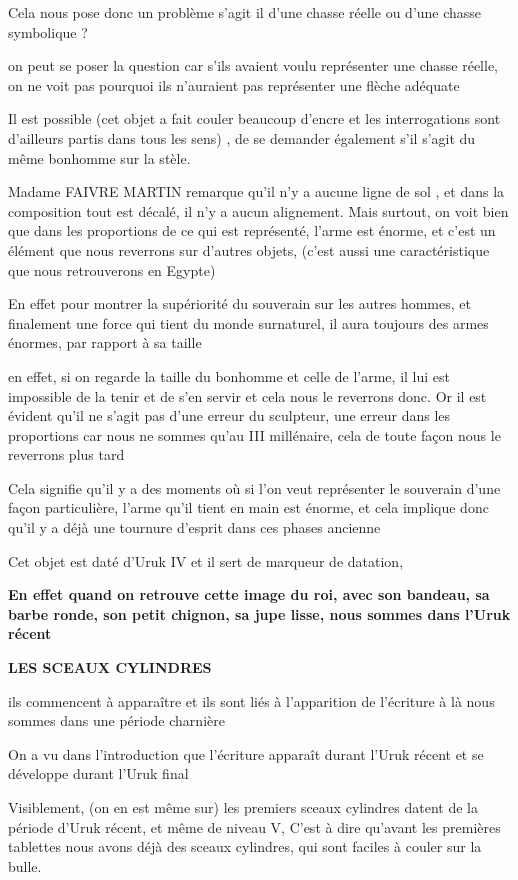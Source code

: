\documentclass[a4paper,10pt]{article}
\begin{document}
Cela nous pose donc un problème  s'agit il
d'une chasse réelle ou d'une chasse
symbolique ?

on peut se poser la question car s'ils avaient voulu
représenter une chasse réelle, on ne voit pas pourquoi ils
n'auraient pas représenter une flèche adéquate

Il est possible (cet objet a fait couler beaucoup
d'encre et les interrogations sont
d'ailleurs partis dans tous les  sens) , de se
demander également s'il s'agit du
même bonhomme sur la stèle.

Madame FAIVRE MARTIN remarque qu'il
n'y a aucune ligne de sol , et dans la composition
tout est décalé, il n'y a aucun alignement. Mais
surtout, on voit bien que dans les proportions de ce qui est
représenté, l'arme est énorme, et
c'est un élément que nous reverrons sur
d'autres objets,  (c'est aussi une
caractéristique que nous retrouverons en Egypte)

En effet pour montrer la supériorité du souverain sur les autres hommes,
et finalement une force qui tient du monde surnaturel, il aura toujours
des armes énormes, par rapport à sa taille 

en effet, si on regarde la taille du bonhomme et celle de
l'arme, il lui est impossible de la tenir et de
s'en servir et cela  nous le reverrons donc. Or il est
évident qu'il ne s'agit pas
d'une erreur du sculpteur, une erreur dans les
proportions car nous ne sommes qu'au III millénaire,
cela de toute façon nous le reverrons plus tard

Cela signifie qu'il y a des moments où si
l'on veut représenter le souverain
d'une façon particulière, l'arme
qu'il tient en main est énorme, et cela implique donc
qu'il y a déjà une tournure d'esprit
dans ces phases ancienne

Cet objet est daté d'Uruk IV et il sert de marqueur de
datation, 

\textbf{En effet quand on retrouve cette  image du roi, avec son
bandeau, sa barbe ronde, son petit chignon, sa jupe lisse, nous sommes
dans l'Uruk récent}

\textbf{LES SCEAUX CYLINDRES}

ils commencent à apparaître et ils sont liés à
l'apparition de l'écriture à là nous
sommes dans une période charnière

On a vu dans l'introduction que
l'écriture apparaît durant l'Uruk
récent et se développe durant l'Uruk final

Visiblement, (on en est même sur) les premiers sceaux cylindres datent
de la période d'Uruk récent, et même de niveau V,
C'est à dire qu'avant les premières
tablettes nous avons déjà des sceaux cylindres, qui sont faciles à
couler sur la bulle.
\end{document}
